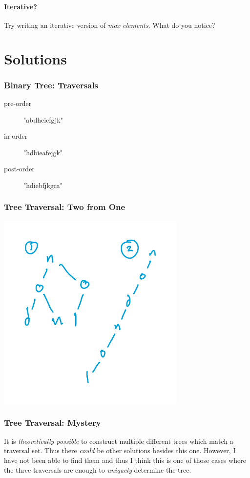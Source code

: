 \documentclass[twoside=false,DIV=14]{scrartcl}
\begin{document}
\subsection{Iterative?}
Try writing an iterative version of \emph{max elements}.  What do you notice?

\newpage\setcounter{section}{0}
\part*{Solutions}

\section{Binary Tree: Traversals}
\begin{description}
    \item[pre-order] "abdheicfgjk"
    \item[in-order] "hdbieafejgk"
    \item[post-order] "hdiebfjkgca"   
\end{description}

\section{Tree Traversal: Two from One}

\includegraphics[width=0.7\textwidth]{nodnol.jpeg}
\section{Tree Traversal: Mystery}

\begin{note}
It is \emph{theoretically possible} to construct multiple different trees which match a traversal set.  Thus there \emph{could} be other solutions besides this one.  However, I have not been able to find them and thus I think this is one of those cases where the three traversals are enough to \emph{uniquely} determine the tree.
\end{note}
\end{document}
